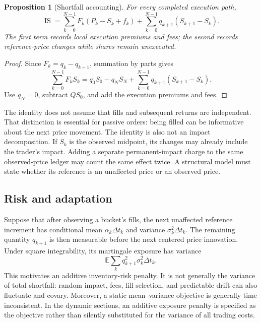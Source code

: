 \documentclass[11pt]{article}
\numberwithin{equation}{section}
\newtheorem{proposition}[theorem]{Proposition}
\theoremstyle{definition}
\theoremstyle{remark}
\newcommand{\E}{\mathbb{E}}
\theoremstyle{definition}
\begin{document}
\begin{proposition}[Shortfall accounting]\label{prop:is}
For every completed execution path,
\begin{equation}\label{eq:decomp}
 \operatorname{IS}
 =\sum_{k=0}^{N-1}F_k(P_k-S_k+f_k)
  +\sum_{k=0}^{N-1}q_{k+1}(S_{k+1}-S_k).
\end{equation}
The first term records local execution premiums and fees; the second records
reference-price changes while shares remain unexecuted.
\end{proposition}
\begin{proof}
Since $F_k=q_k-q_{k+1}$, summation by parts gives
\[
 \sum_{k=0}^{N-1}F_kS_k
 =q_0S_0-q_NS_N+\sum_{k=0}^{N-1}q_{k+1}(S_{k+1}-S_k).
\]
Use $q_N=0$, subtract $QS_0$, and add the execution premiums and fees.
\end{proof}

The identity does not assume that fills and subsequent returns are independent.
That distinction is essential for passive orders: being filled can be informative
about the next price movement. The identity is also not an impact decomposition.
If $S_k$ is the observed midpoint, its changes may already include the trader's
impact. Adding a separate permanent-impact charge to the same observed-price
ledger may count the same effect twice. A structural model must state whether
its reference is an unaffected price or an observed price.

\subsection{Risk and adaptation}

Suppose that after observing a bucket's fills, the next unaffected reference
increment has conditional mean $\alpha_k\Delta t_k$ and variance
$\sigma_k^2\Delta t_k$. The remaining quantity $q_{k+1}$ is then measurable
before the next centered price innovation. Under square integrability, its
martingale exposure has variance
\begin{equation}\label{eq:exposure}
 \E\sum_k q_{k+1}^2\sigma_k^2\Delta t_k.
\end{equation}
This motivates an additive inventory-risk penalty. It is not generally the
variance of total shortfall: random impact, fees, fill selection, and predictable
drift can also fluctuate and covary. Moreover, a static mean--variance objective
is generally time inconsistent. In the dynamic sections, an additive exposure
penalty is specified as the objective rather than silently substituted for the
variance of all trading costs.
\end{document}
